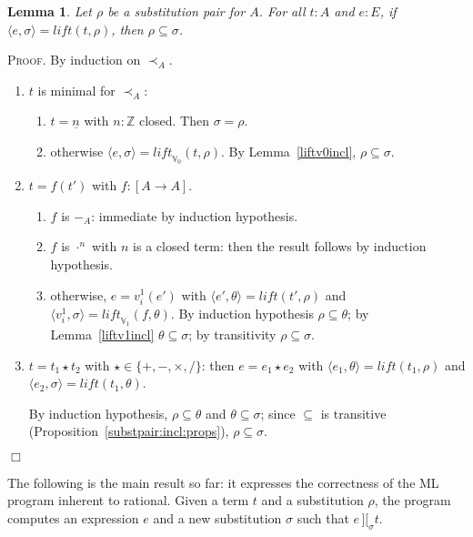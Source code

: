 \documentclass{article}
\newtheorem{lemma}[definition]{Lemma}
\newenvironment{proof}{\smallskip\textsc{Proof.}}{\hspace*{\fill}$\Box$}
\newcommand{\intII}{\,]\![}
\newcommand{\Z}{{\mathbb Z}}
\newcommand{\V}{{\mathbb V}}
\newcommand{\tacticname}[1]{\textsf{#1}}
\newcommand{\rational}{\tacticname{rational}}
\newcommand{\less}{\mathrel{\prec_A}}
\newcommand{\liftv}[1]{\ensuremath{\mathit{lift}_{\V_{#1}}}}
\newcommand{\lift}{\ensuremath{\mathit{lift}}}
\newcommand{\intrels}{\mathbin{\intII_{\sigma}}}
\begin{document}
\begin{lemma}\label{liftincl}
Let $\rho$ be a substitution pair for $A$.  For all $t:A$ and $e:E$, if
$\langle e,\sigma\rangle=\lift(t,\rho)$, then $\rho\subseteq\sigma$.
\end{lemma}
\begin{proof} By induction on $\less$.
\begin{enumerate}
\item $t$ is minimal for $\less$:
\begin{enumerate}
\item $t=\underline n$ with $n:\Z$ closed.  Then $\sigma=\rho$.
\item otherwise $\langle e,\sigma\rangle=\liftv0(t,\rho)$.  By
Lemma~\ref{liftv0incl}, $\rho\subseteq\sigma$.
\end{enumerate}
\item $t=f(t')$ with $f:[A\to A]$.
\begin{enumerate}
\item $f$ is $-_A$: immediate by induction hypothesis.
\item $f$ is $\cdot^n$ with $n$ is a closed term: then the result follows by
induction hypothesis.
\item otherwise, $e=v^1_i(e')$ with
$\langle e',\theta\rangle=\lift(t',\rho)$ and
$\langle v^1_i,\sigma\rangle=\liftv1(f,\theta)$.  By induction hypothesis
$\rho\subseteq\theta$; by Lemma~\ref{liftv1incl}
$\theta\subseteq\sigma$; by transitivity $\rho\subseteq\sigma$.
\end{enumerate}
\item $t=t_1\star t_2$ with $\star\in\{+,-,\times,/\}$: then
$e=e_1\star e_2$ with $\langle e_1,\theta\rangle=\lift(t_1,\rho)$
and $\langle e_2,\sigma\rangle=\lift(t_1,\theta)$.

By induction hypothesis, $\rho\subseteq\theta$ and $\theta\subseteq\sigma$;
since $\subseteq$ is transitive (Proposition~\ref{substpair:incl:props}),
$\rho\subseteq\sigma$.
\end{enumerate}
\end{proof}

The following is the main result so far: it expresses the correctness
of the ML program inherent to {\rational}.
Given a term $t$ and a substitution $\rho$, the program computes an
expression $e$ and a new substitution $\sigma$ such that $e\intrels t$.
\end{document}
